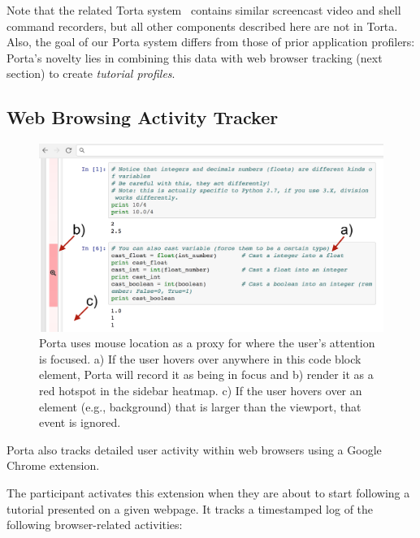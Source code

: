 Note that the related Torta system~\cite{MysoreUIST2017} contains
similar screencast video and shell command recorders, but all other
components described here are not in Torta. Also, the goal of
our Porta system differs from those of prior application profilers:
Porta's novelty lies in combining this data with web browser tracking
(next section) to create \emph{tutorial profiles}.


\subsection{Web Browsing Activity Tracker}

\begin{figure}[h!]
\includegraphics[width=\columnwidth]{figures/porta/mouse-hover.png}
\vspace{-0.5em} %
\caption{Porta uses mouse location as a proxy for where the user's
attention is focused. a) If the user hovers over anywhere in this code
block element, Porta will record it as being in focus and b) render it
as a red hotspot in the sidebar heatmap. c) If the user hovers over an
element (e.g., background) that is larger than the viewport, that event
is ignored.}
\label{fig:browser-tracking}
\vspace{-0.25em} %

\end{figure}

Porta also tracks detailed user activity within web browsers using a
Google Chrome extension.

The participant activates this extension when they are about to start
following a tutorial presented on a given webpage. It tracks a
timestamped log of the following browser-related activities:

